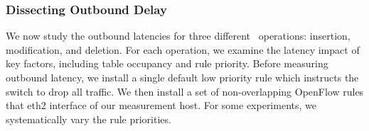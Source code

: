 \subsubsection{Dissecting Outbound Delay} 
\label{mazu-outbound_meas}

We now study the outbound latencies for three different \flowmod\
operations: insertion, modification, and deletion. For each operation, we
examine the latency impact of key factors, including table
occupancy and rule priority.
Before measuring outbound latency, we install a single default low priority
rule which instructs the switch to drop all traffic. We then install a set of
non-overlapping OpenFlow rules that
eth2 interface of our measurement host. For some experiments, we 
systematically vary the rule priorities.




